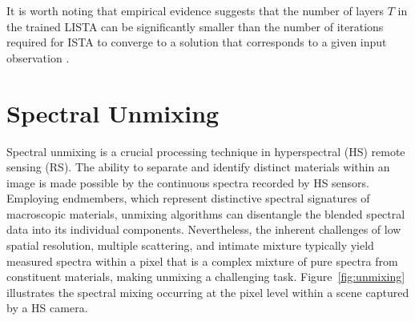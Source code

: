 It is worth noting that empirical evidence suggests that the number of layers $T$ in the trained LISTA can be significantly smaller than the number of iterations required for ISTA to converge to a solution that corresponds to a given input observation \cite{gregor_learning_2010}.





\section{Spectral Unmixing}
\label{sec:unmixing}
Spectral unmixing is a crucial processing technique in hyperspectral (HS) remote sensing (RS).
The ability to separate and identify distinct materials within an image is made possible by the continuous spectra recorded by HS sensors.
Employing endmembers, which represent distinctive spectral signatures of macroscopic materials, unmixing algorithms can disentangle the blended spectral data into its individual components.
Nevertheless, the inherent challenges of low spatial resolution, multiple scattering, and intimate mixture typically yield measured spectra within a pixel that is a complex mixture of pure spectra from constituent materials, making unmixing a challenging task.
Figure~\ref{fig:unmixing} illustrates the spectral mixing occurring at the pixel level within a scene captured by a HS camera.

